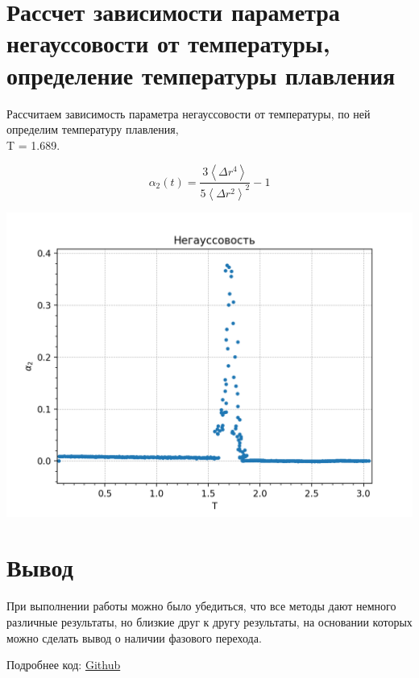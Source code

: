 \section{Рассчет зависимости параметра негауссовости от температуры, определение температуры плавления}

\begin{minipage}{0.47\textwidth}
    Рассчитаем зависимость параметра негауссовости от температуры, по ней определим температуру плавления,\\ T = 1.689. 
    
   $$\alpha_{2}(t)=\frac{3\left\langle\Delta r^{4}\right\rangle}{5\left\langle\Delta r^{2}\right\rangle^{2}}-1$$
   
\end{minipage}
\begin{minipage}{0.47\textwidth}
    \begin{center}
        \includegraphics[width=\linewidth]{123.png}\\
    \end{center}
\end{minipage}


\section*{Вывод}

При выполнении работы можно было убедиться, что все методы дают немного различные результаты, но близкие друг к другу результаты, на основании которых можно сделать вывод о наличии фазового перехода. 

Подробнее код: \href{}{Github}


